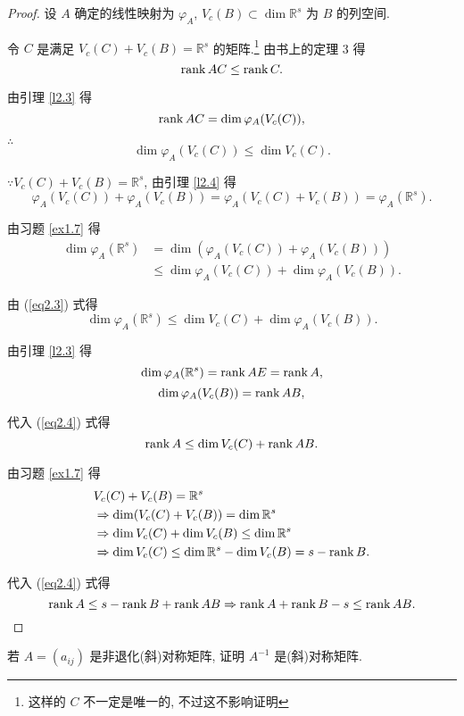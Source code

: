 \documentclass{ctexart}
\begin{document}
\begin{proof}
    设 $A$ 确定的线性映射为 $\varphi_A$, $V_c(B)\subset\dim\mathbb{R}^s$ 为 $B$ 的列空间.

    令 $C$ 是满足 $V_c(C)+V_c(B)=\mathbb{R}^s$ 的矩阵.\footnote{这样的 $C$ 不一定是唯一的, 不过这不影响证明} 由书上的定理 3 得
    \[\operatorname{rank} AC\leq\operatorname{rank} C.\]

    由引理 \ref{l2.3} 得
    \[\operatorname{rank} AC=\dim\varphi_A(V_c(C)),\]

    $\therefore$
    \begin{equation}\label{eq2.3}
        \dim\varphi_A(V_c(C))\leq\dim V_c(C).
    \end{equation}

    $\because V_c(C)+V_c(B)=\mathbb{R}^s$, 由引理 \ref{l2.4} 得
    \[\varphi_A(V_c(C))+\varphi_A(V_c(B))=\varphi_A(V_c(C)+V_c(B))=\varphi_A(\mathbb{R}^s).\]

    由习题 \ref{ex1.7} 得
    \begin{align*}
        \dim\varphi_A(\mathbb{R}^s) & =\dim(\varphi_A(V_c(C))+\varphi_A(V_c(B))) \\
        & \leq\dim\varphi_A(V_c(C))+\dim\varphi_A(V_c(B)).
    \end{align*}

    由 (\ref{eq2.3}) 式得
    \begin{equation}\label{eq2.4}
        \dim\varphi_A(\mathbb{R}^s)\leq\dim V_c(C)+\dim\varphi_A(V_c(B)).
    \end{equation}

    由引理 \ref{l2.3} 得
    \[\dim\varphi_A(\mathbb{R}^s)=\operatorname{rank} AE=\operatorname{rank} A,\]
    \[\dim\varphi_A(V_c(B))=\operatorname{rank} AB,\]

    代入 (\ref{eq2.4}) 式得
    \[\operatorname{rank} A\leq\dim V_c(C)+\operatorname{rank} AB.\]

    由习题 \ref{ex1.7} 得
    \begin{align*}
        & V_c(C)+V_c(B)=\mathbb{R}^s \\
        & \Rightarrow\dim (V_c(C)+V_c(B))=\dim\mathbb{R}^s \\
        & \Rightarrow\dim V_c(C)+\dim V_c(B)\leq\dim\mathbb{R}^s \\
        & \Rightarrow\dim V_c(C)\leq\dim\mathbb{R}^s-\dim V_c(B)=s-\operatorname{rank} B.
    \end{align*}

    代入 (\ref{eq2.4}) 式得
    \[\operatorname{rank} A\leq s-\operatorname{rank} B+\operatorname{rank} AB\Rightarrow\operatorname{rank} A+\operatorname{rank} B-s\leq\operatorname{rank} AB.\qedhere\]
\end{proof}
\setcounter{exercise}{10}
\begin{exercise}[有修改]
    若 $A=(a_{ij})$ 是非退化(斜)对称矩阵, 证明 $A^{-1}$ 是(斜)对称矩阵.
\end{exercise}
\end{document}
